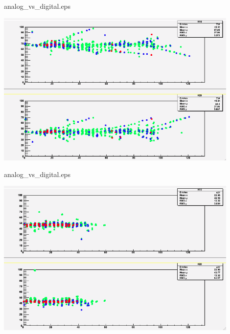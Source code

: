 \begin{frame}{analog\_vs\_digital.eps}
  \centerline{\includegraphics[width=0.9\textwidth]{images/50GevPion}}
\end{frame}
\begin{frame}{analog\_vs\_digital.eps}
  \centerline{\includegraphics[width=0.9\textwidth]{images/50GevElectron}}
\end{frame}

